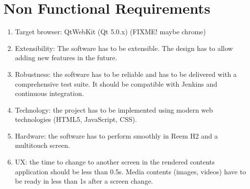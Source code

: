 \section{Non Functional Requirements}
\begin{enumerate}
    \item Target browser: QtWebKit (Qt 5.0.x) (FIXME! maybe chrome)
    \item Extensibility: The software has to be extensible. The design has to allow adding new features in the future.
    \item Robustness: the software has to be reliable and has to be delivered with a comprehensive test suite. It should be compatible with Jenkins and continuous integration.
    \item Technology: the project has to be implemented using modern web technologies (HTML5, JavaScript, CSS).
    \item Hardware: the software has to perform smoothly in Reem H2 and a multitouch screen.
    \item UX: the time to change to another screen in the rendered contents application should be less than 0.5s. Media contents (images, videos) have to be ready in less than 1s after a screen change.
\end{enumerate}
